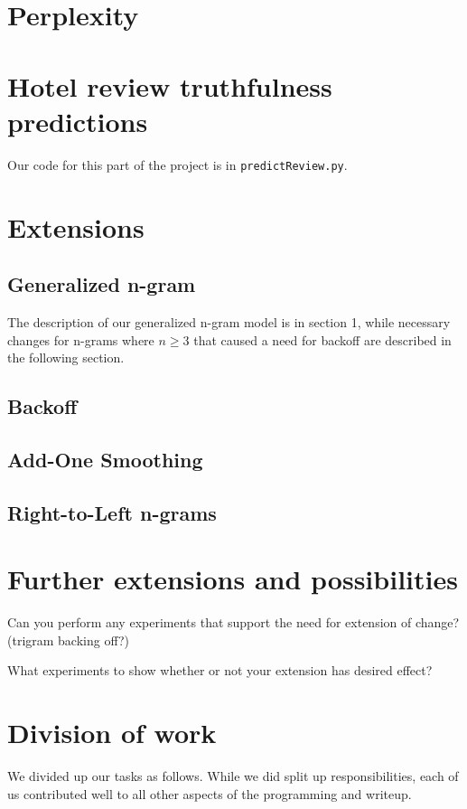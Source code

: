 \documentclass{article}
\begin{document}
\section{Perplexity}
\lipsum[4]

\section{Hotel review truthfulness predictions}
Our code for this part of the project is in \texttt{predictReview.py}.
\lipsum[4]

\section{Extensions}

\subsection{Generalized n-gram}

The description of our generalized n-gram model is in section 1, while necessary changes for n-grams where $n\geq3$ that caused a need for backoff are described in the following section.

\subsection{Backoff}

\subsection{Add-One Smoothing}

\subsection{Right-to-Left n-grams}

\section{Further extensions and possibilities}
Can you perform any experiments that support the need for extension of change? (trigram backing off?)\par
What experiments to show whether or not your extension has desired effect?\par
\lipsum[4]

\section{Division of work}
We divided up our tasks as follows. While we did split up responsibilities, each of us contributed well to all other aspects of the programming and writeup.
\end{document}
